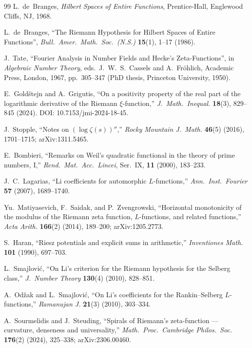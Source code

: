 \documentclass[11pt]{article}
\begin{document}
\begin{thebibliography}{99}
L.~de~Branges,
\emph{Hilbert Spaces of Entire Functions},
Prentice-Hall, Englewood Cliffs, NJ, 1968.

L.~de~Branges,
``The Riemann Hypothesis for Hilbert Spaces of Entire
Functions'',
\emph{Bull.\ Amer.\ Math.\ Soc.\ (N.S.)} \textbf{15}(1),
1--17 (1986).

J.~Tate,
``Fourier Analysis in Number Fields and Hecke's
Zeta-Functions'',
in \emph{Algebraic Number Theory},
eds.\ J.~W.~S.~Cassels and A.~Fr\"ohlich,
Academic Press, London, 1967, pp.\ 305--347
(PhD thesis, Princeton University, 1950).

E.~Gold\v{s}tejn and A.~Grigutis,
``On a positivity property of the real part of the
logarithmic derivative of the Riemann $\xi$-function,''
\emph{J.\ Math.\ Inequal.} \textbf{18}(3), 829--845 (2024).
DOI: 10.7153/jmi-2024-18-45.

J.~Stopple,
``Notes on $(\log\zeta(s))''$,''
\emph{Rocky Mountain J.\ Math.} \textbf{46}(5) (2016),
1701--1715; arXiv:1311.5465.

E.~Bombieri,
``Remarks on Weil's quadratic functional in the theory
of prime numbers, I,''
\emph{Rend.\ Mat.\ Acc.\ Lincei}, Ser.~IX,
\textbf{11} (2000), 183--233.

J.~C.~Lagarias,
``Li coefficients for automorphic $L$-functions,''
\emph{Ann.\ Inst.\ Fourier} \textbf{57} (2007),
1689--1740.

Yu.~Matiyasevich, F.~Saidak, and P.~Zvengrowski,
``Horizontal monotonicity of the modulus of the
Riemann zeta function, $L$-functions, and related
functions,''
\emph{Acta Arith.} \textbf{166}(2) (2014), 189--200;
arXiv:1205.2773.

S.~Haran,
``Riesz potentials and explicit sums in arithmetic,''
\emph{Inventiones Math.} \textbf{101} (1990), 697--703.

L.~Smajlovi\'c,
``On Li's criterion for the Riemann hypothesis for
the Selberg class,''
\emph{J.\ Number Theory} \textbf{130}(4) (2010),
828--851.

A.~Od\v{z}ak and L.~Smajlovi\'c,
``On Li's coefficients for the Rankin--Selberg
$L$-functions,''
\emph{Ramanujan J.} \textbf{21}(3) (2010), 303--334.

A.~Sourmelidis and J.~Steuding,
``Spirals of Riemann's zeta-function --- curvature,
denseness and universality,''
\emph{Math.\ Proc.\ Cambridge Philos.\ Soc.}
\textbf{176}(2) (2024), 325--338; arXiv:2306.00460.


\end{thebibliography}
\end{document}
